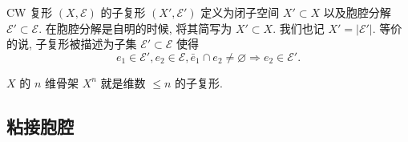 \begin{definition}
    CW 复形 $(X,\mathcal{E})$ 的子复形 $(X',\mathcal{E}')$ 定义为闭子空间 $X'\subset X$ 以及胞腔分解 $\mathcal{E}'\subset \mathcal{E}$.
    在胞腔分解是自明的时候, 将其简写为 $X'\subset X$. 
    我们也记 $X' = |\mathcal{E}'|$. 等价的说, 子复形被描述为子集 $\mathcal{E}'\subset \mathcal{E}$ 使得
    \[
        e_1\in \mathcal{E}', e_2\in\mathcal{E}, \bar{e}_1\cap e_2 \neq \varnothing\Rightarrow e_2\in \mathcal{E}'.
    \] 
\end{definition}
\begin{example}
    $X$ 的 $n$ 维骨架 $X^n$ 就是维数 $\leq n$ 的子复形.
\end{example}
\subsection{粘接胞腔}
